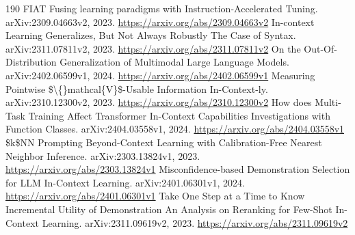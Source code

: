 \documentclass[11pt]{article}
\begin{document}
\begin{thebibliography}{190}
 FIAT Fusing learning paradigms with Instruction-Accelerated Tuning. arXiv:2309.04663v2, 2023. \url{https://arxiv.org/abs/2309.04663v2}
 In-context Learning Generalizes, But Not Always Robustly The Case of Syntax. arXiv:2311.07811v2, 2023. \url{https://arxiv.org/abs/2311.07811v2}
 On the Out-Of-Distribution Generalization of Multimodal Large Language Models. arXiv:2402.06599v1, 2024. \url{https://arxiv.org/abs/2402.06599v1}
 Measuring Pointwise \$\textbackslash\{\}mathcal\{V\}\$-Usable Information In-Context-ly. arXiv:2310.12300v2, 2023. \url{https://arxiv.org/abs/2310.12300v2}
 How does Multi-Task Training Affect Transformer In-Context Capabilities Investigations with Function Classes. arXiv:2404.03558v1, 2024. \url{https://arxiv.org/abs/2404.03558v1}
 \$k\$NN Prompting Beyond-Context Learning with Calibration-Free Nearest Neighbor Inference. arXiv:2303.13824v1, 2023. \url{https://arxiv.org/abs/2303.13824v1}
 Misconfidence-based Demonstration Selection for LLM In-Context Learning. arXiv:2401.06301v1, 2024. \url{https://arxiv.org/abs/2401.06301v1}
 Take One Step at a Time to Know Incremental Utility of Demonstration An Analysis on Reranking for Few-Shot In-Context Learning. arXiv:2311.09619v2, 2023. \url{https://arxiv.org/abs/2311.09619v2}
\end{thebibliography}
\end{document}
